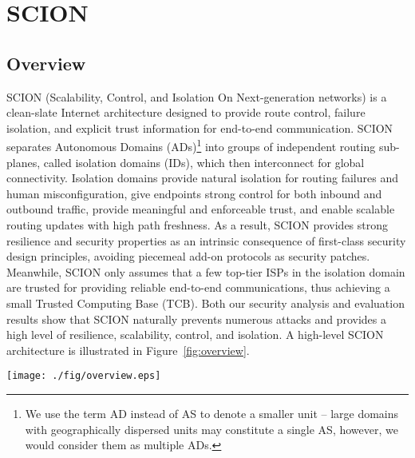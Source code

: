 \section{SCION}

\subsection{Overview}

SCION (Scalability, Control, and Isolation On Next-generation networks) is a
clean-slate Internet architecture designed to provide route control, failure
isolation, and explicit trust information for end-to-end communication. SCION
separates Autonomous Domains (ADs)\footnote{We use the term AD instead of AS to
  denote a smaller unit -- large domains with geographically dispersed units may
  constitute a single AS, however, we would consider them as multiple ADs.} into
groups of independent routing sub-planes, called isolation domains (IDs), which then
interconnect for global connectivity. Isolation domains provide natural isolation
for routing failures and human misconfiguration, give endpoints strong control
for both inbound and outbound traffic, provide meaningful and enforceable trust,
and enable scalable routing updates with high path freshness. As a result, SCION
provides strong resilience and security properties as an intrinsic consequence
of first-class security design principles, avoiding piecemeal add-on protocols
as security patches. Meanwhile, SCION only assumes that a few top-tier ISPs in
the isolation domain are trusted for providing reliable end-to-end communications,
thus achieving a small Trusted Computing Base (TCB). Both our security analysis
and evaluation results show that SCION naturally prevents numerous attacks and
provides a high level of resilience, scalability, control, and isolation. A
high-level SCION architecture is illustrated in Figure~\ref{fig:overview}.

\begin{figure*}[ht]
\centering
\texttt{[image: ./fig/overview.eps]}
\caption{SCION Architecture.}\label{fig:overview}
\end{figure*}


